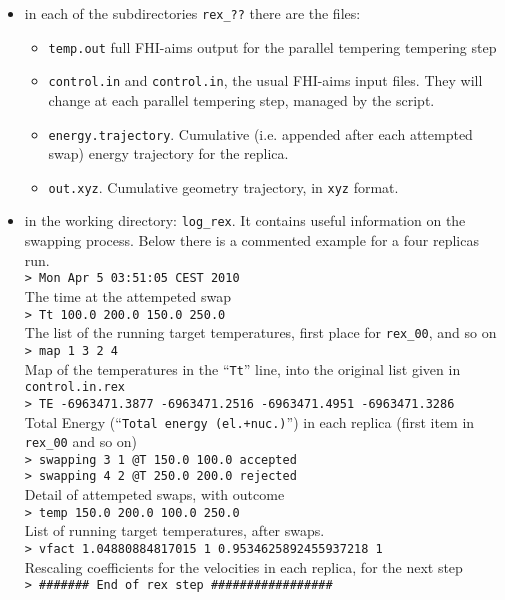 \begin{itemize}

\item in each of the subdirectories \texttt{rex\_??} there are the files:
\begin{itemize}
 \item \texttt{temp.out} full FHI-aims output for the parallel tempering tempering step
 \item \texttt{control.in} and \texttt{control.in}, the usual FHI-aims input files. They will change at each parallel tempering step, managed by the script.
 \item \texttt{energy.trajectory}. Cumulative (i.e. appended after each attempted swap) energy trajectory for the replica.
 \item \texttt{out.xyz}. Cumulative geometry trajectory, in \texttt{xyz} format.
\end{itemize}

 \item in the working directory: \texttt{log\_rex}. It contains useful information on the swapping process. Below there is a commented example for a four replicas run. \\

\texttt{> Mon Apr  5 03:51:05 CEST 2010}\\
The time at the attempeted swap\\
\texttt{> Tt        100.0 200.0 150.0 250.0}\\
The list of the running target temperatures, first place for \texttt{rex\_00}, and so on\\
\texttt{> map       1 3 2 4}\\
Map of the temperatures in the ``\texttt{Tt}'' line, into the original list given in \texttt{control.in.rex}\\
\texttt{> TE      -6963471.3877  -6963471.2516  -6963471.4951  -6963471.3286  }\\
Total Energy (``\texttt{Total energy (el.+nuc.)}'') in each replica (first item in \texttt{rex\_00} and so on)\\
\texttt{> swapping        3       1        @T     150.0   100.0   accepted}\\
\texttt{> swapping        4       2        @T     250.0   200.0   rejected}\\
Detail of attempeted swaps, with outcome\\
\texttt{> temp      150.0 200.0 100.0 250.0 }\\
List of running target temperatures, after swaps.\\
\texttt{> vfact     1.04880884817015 1 0.9534625892455937218 1}\\
Rescaling coefficients for the velocities in each replica, for the next step\\
\texttt{> \#\#\#\#\#\#\# End of rex step \#\#\#\#\#\#\#\#\#\#\#\#\#\#\#\#\#}\\
 

\end{itemize}
